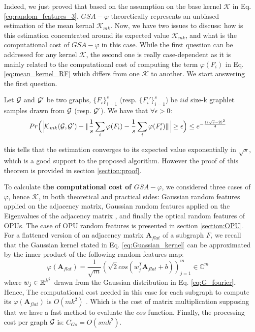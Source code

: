 Indeed, we just proved that based on the assumption on the base kernel $\mathcal{K}$ in Eq. \ref{eq:random_features_3}, $GSA-\varphi$ theoretically represents an unbiased estimation of the mean kernal $\mathcal{K}_{mk}$. Now, we have two issues to discuss: how is this estimation concentrated around its expected value $\mathcal{K}_{mk}$, and what is the computational cost of $GSA-\varphi$ in this case. While the first question can be addressed for any kernel $\mathcal{K}$, the second one is really case-dependent as it is mainly related to the computational cost of computing the term $\varphi(F_i)$ in Eq. \ref{eq:mean_kernel_RF} which differs from one $\mathcal{K}$ to another. We start answering the first question.


\begin{theorem}
\label{theorem:concentration}
Let $\mathcal{G}$ and $\mathcal{G}'$ be two graphs, $\{F_i\}_{i=1}^{s}$ (resp. $\{F_i'\}_{i=1}^{s}$) be $iid$ size-k graphlet samples drawn from $\mathcal{G}$ (resp. $\mathcal{G}'$). We have that $\forall \epsilon >0$:
\begin{align*}
    Pr\Big(\Big | \mathcal{K}_{mk}(\mathcal{G},\mathcal{G}') - \| \frac{1}{s} \sum_i \varphi(F_i) - \frac{1}{s} \sum_i \varphi(F'_i)\|\Big | \geq
    \epsilon\Big)\leq e^{-\frac{(\epsilon\sqrt{s}-2)^2}{4}}
\end{align*}
\end{theorem}
this tells that the estimation converges to its expected value exponentially in $\sqrt{s}$, which is a good support to the proposed algorithm. However the proof of this theorem is provided in section \ref{section:proof}.

To calculate \textbf{the computational cost of $GSA-\varphi$}, we considered three cases of $\varphi$, hence $\mathcal{K}$, in both theoretical and practical sides: Gaussian random features applied on the adjacency matrix, Gaussian random features applied on the Eigenvalues of the adjacency matrix , and finally the optical random features of OPUs. The case of OPU random features is presented in section \ref{section:OPU}.\newline
For a flattened version of an adjacency matrix $\mathbf{A}_{flat}$ of a subgraph $F$, we recall that the Gaussian kernel stated in Eq. \ref{eq:Guassian_kernel} can be approximated by the inner product of the following random features map:
\[
\varphi(\mathbf{A}_{flat}) = \frac{1}{\sqrt{m}} ( \sqrt{2}cos(w_j^T\mathbf{A}_{flat}+b) )_{j=1}^m \in \mathbb{C}^m
\]
where $w_j\in\mathbb{R}^{k^2}$ drawn from the Gaussian distribution in Eq. \ref{eq:G_fourier}. Hence, The computational cost needed in this case for each subgraph to compute its $\varphi(\mathbf{A}_{flat})$ is $O(mk^2)$ . Which is the cost of matrix multiplication supposing that we have a fast method to evaluate the $cos$ function. Finally, the processing cost per graph $\mathcal{G}$ is: $C_{Gs}=O(smk^2)$.


